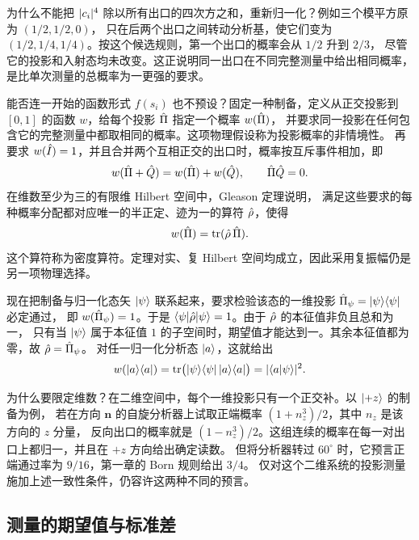 为什么不能把 $\lvert c_i\rvert^4$ 除以所有出口的四次方之和，重新归一化？例如三个模平方原为 $(1/2,1/2,0)$，
只在后两个出口之间转动分析基，使它们变为 $(1/2,1/4,1/4)$。按这个候选规则，第一个出口的概率会从 $1/2$ 升到 $2/3$，
尽管它的投影和入射态均未改变。这正说明同一出口在不同完整测量中给出相同概率，是比单次测量的总概率为一更强的要求。

能否连一开始的函数形式 $f(s_i)$ 也不预设？固定一种制备，定义从正交投影到 $[0,1]$ 的函数 $w$，给每个投影 $\hat{\Pi}$ 指定一个概率 $w(\hat{\Pi})$，
并要求同一投影在任何包含它的完整测量中都取相同的概率。这项物理假设称为投影概率的非情境性。
再要求 $w(\hat{I}) = 1$，并且合并两个互相正交的出口时，概率按互斥事件相加，即
\begin{equation}\label{eq:qm-additive-projection-probability}
    w(\hat{\Pi} + \hat{Q}) = w(\hat{\Pi}) + w(\hat{Q}),\qquad \hat{\Pi}\hat{Q} = 0 .
\end{equation}
在维数至少为三的有限维 Hilbert 空间中，Gleason 定理\cite{gleason1957}说明，
满足这些要求的每种概率分配都对应唯一的半正定、迹为一的算符 $\hat{\rho}$，使得
\begin{equation}\label{eq:qm-gleason-probability}
    w(\hat{\Pi}) = \operatorname{tr}(\hat{\rho}\,\hat{\Pi}).
\end{equation}
这个算符称为密度算符。定理对实、复 Hilbert 空间均成立，因此采用复振幅仍是另一项物理选择。

现在把制备与归一化态矢 $\lvert\psi\rangle$ 联系起来，要求检验该态的一维投影 $\hat{\Pi}_\psi = \lvert\psi\rangle\langle\psi\rvert$ 必定通过，
即 $w(\hat{\Pi}_\psi) = 1$。于是 $\langle\psi\vert\hat{\rho}\vert\psi\rangle = 1$。由于 $\hat{\rho}$ 的本征值非负且总和为一，
只有当 $\lvert\psi\rangle$ 属于本征值 $1$ 的子空间时，期望值才能达到一。其余本征值都为零，故 $\hat{\rho} = \hat{\Pi}_\psi$。
对任一归一化分析态 $\lvert a\rangle$，这就给出
\[
    w(\lvert a\rangle\langle a\rvert) = \operatorname{tr}\bigl(\lvert\psi\rangle\langle\psi\rvert\,\lvert a\rangle\langle a\rvert\bigr)
    = \lvert\langle a\vert\psi\rangle\rvert^2 .
\]

为什么要限定维数？在二维空间中，每个一维投影只有一个正交补。以 $\lvert+z\rangle$ 的制备为例，
若在方向 $\bm n$ 的自旋分析器上试取正端概率 $(1 + n_z^3)/2$，其中 $n_z$ 是该方向的 $z$ 分量，
反向出口的概率就是 $(1 - n_z^3)/2$。这组连续的概率在每一对出口上都归一，并且在 $+z$ 方向给出确定读数。
但将分析器转过 $60^\circ$ 时，它预言正端通过率为 $9/16$，第一章的 Born 规则给出 $3/4$。
仅对这个二维系统的投影测量施加上述一致性条件，仍容许这两种不同的预言。

\subsection{测量的期望值与标准差}
\label{ss:measurement-moments}

